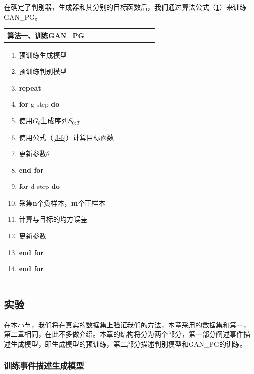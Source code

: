 \documentclass[]{template}
\begin{document}
在确定了判别器，生成器和其分别的目标函数后，我们通过算法公式（\ref{s3-1}）来训练GAN\_PG。
\begin{table}[htbp]
    \label{s3-1}
    \begin{center}
        \begin{tabular*}{.75\linewidth}{p{0.75\linewidth}}
\toprule
            算法一、训练GAN\_PG \\
\midrule
\begin{minipage}[t]{\linewidth}
\begin{enumerate}[itemsep=-10pt]
    \item 预训练生成模型
    \item 预训练判别模型
    \item \textbf{repeat}
    \item \quad \textbf{for} g-step \textbf{do}
    \item \quad \quad 使用$G_\theta$生成序列$S_{0:T}$
    \item \quad \quad 使用公式（\ref{3-5}）计算目标函数
    \item \quad \quad 更新参数$\theta$
    \item \quad \textbf{end for}
    \item \quad \textbf{for} d-step \textbf{do}
    \item \quad \quad 采集\textbf{n}个负样本，\textbf{m}个正样本
    \item \quad \quad 计算与目标的均方误差
    \item \quad \quad 更新参数
    \item \quad \textbf{end for}  
    \item \textbf{end for}
\end{enumerate}
\end{minipage}\\
\bottomrule
        \end{tabular*}
    \end{center}
\end{table}

\subsection{实验}
在本小节，我们将在真实的数据集上验证我们的方法，本章采用的数据集和第一，第二章相同，在此不多做介绍。本章的结构将分为两个部分，第一部分阐述事件描述生成模型，即生成模型的预训练，第二部分描述判别模型和GAN\_PG的训练。
\subsubsection{训练事件描述生成模型}\label{train_generator}
\end{document}
